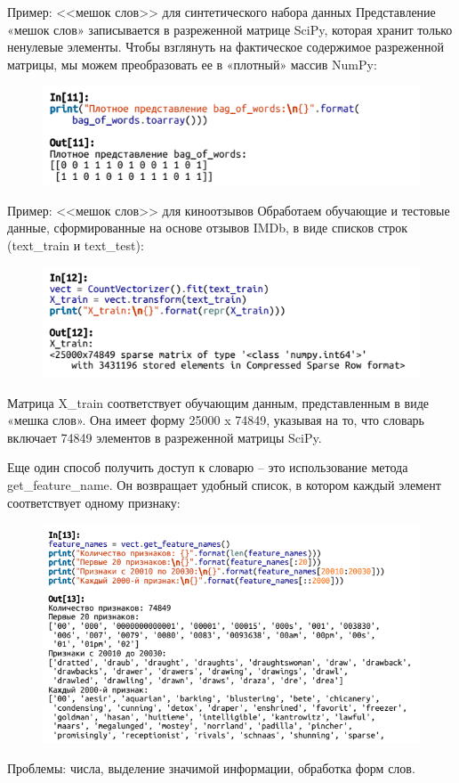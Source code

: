 \documentclass{beamer}
\begin{document}
\begin{frame}{Пример: <<мешок слов>> для синтетического набора данных}
Представление «мешок слов» записывается в разреженной матрице SciPy, которая хранит только ненулевые элементы. Чтобы взглянуть на фактическое содержимое разреженной матрицы, мы можем
преобразовать ее в «плотный» массив NumPy: 
\begin{figure}[h]
\centering
\includegraphics[scale=0.75]{images/lec09-pic11.png}
\end{figure}
\end{frame}

\begin{frame}{Пример: <<мешок слов>> для киноотзывов}
Обработаем обучающие и тестовые данные, сформированные на основе отзывов IMDb, в виде списков строк (text\_train и text\_test): 
\begin{figure}[h]
\centering
\includegraphics[scale=0.75]{images/lec09-pic12.png}
\end{figure}
Матрица X\_train соответствует обучающим данным, представленным в виде «мешка слов». Она имеет форму 25000 x 74849, указывая на то, что словарь включает 74849 элементов в разреженной матрицы SciPy.
\end{frame}

\begin{frame}
Еще один способ получить доступ к словарю – это использование метода get\_feature\_name. Он возвращает удобный список, в котором каждый элемент соответствует одному признаку: 
\begin{figure}[h]
\centering
\includegraphics[scale=0.5]{images/lec09-pic13.png}
\end{figure}
Проблемы: числа, выделение значимой информации, обработка форм слов. 
\end{frame}
\end{document}
